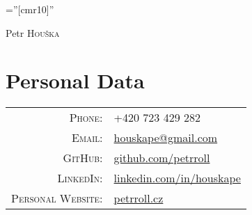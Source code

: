 \documentclass[a4paper,10pt]{article}
\begin{document}

\pagestyle{empty} %

\font\fb=''[cmr10]'' %

\par{\centering
		{\Huge Petr \textsc{Houška} 
	}\bigskip\par}


\section{Personal Data}

\begin{tabular}{rl}
    \textsc{Phone:}     & +420 723 429 282 \\
    \textsc{Email:}     & \href{mailto:houskape@gmail.com}{houskape@gmail.com} \\
    \textsc{GitHub:}	& \href{https://github.com/petrroll/}{github.com/petrroll} \\
    \textsc{LinkedIn:}	& \href{https://linkedin.com/in/houskape}{linkedin.com/in/houskape} \\
    \textsc{Personal Website:}	& \href{http://petrroll.cz}{petrroll.cz}
    \\
\end{tabular}

\end{document}
